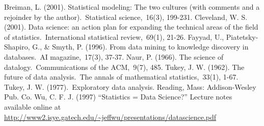 \documentclass[
]{book}
\begin{document}
Breiman, L. (2001). Statistical modeling: The two cultures (with comments and a rejoinder by the author).~Statistical science,~16(3), 199-231.
Cleveland, W. S. (2001). Data science: an action plan for expanding the technical areas of the field of statistics.~International statistical review,~69(1), 21-26.
Fayyad, U., Piatetsky-Shapiro, G., \& Smyth, P. (1996). From data mining to knowledge discovery in databases.~AI magazine,~17(3), 37-37.
Naur, P. (1966). The science of datalogy.~Communications of the ACM,~9(7), 485.
Tukey, J. W. (1962). The future of data analysis.~The annals of mathematical statistics,~33(1), 1-67.
Tukey, J. W. (1977).~Exploratory data analysis. Reading, Mass: Addison-Wesley Pub. Co.
Wu, C. F. J. (1997) ``Statistics = Data Science?'' Lecture notes available online at \url{http://www2.isye.gatech.edu/~jeffwu/presentations/datascience.pdf}

  
\end{document}
